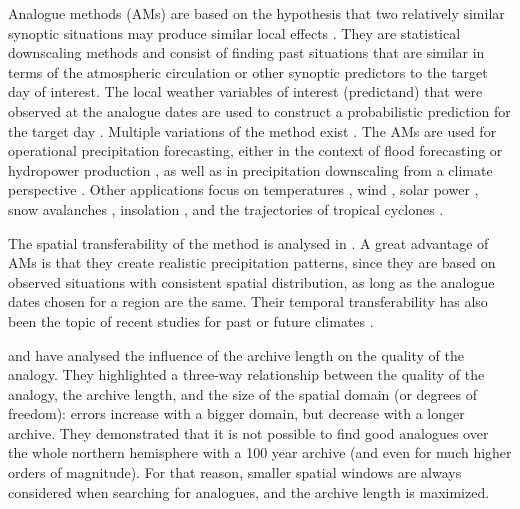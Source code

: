 \documentclass[hess, manuscript]{copernicus}
\begin{document}
	
	
	\introduction  %
	\label{sec:introduction}
	
	Analogue methods (AMs) are based on the hypothesis that two relatively similar synoptic situations may produce similar local effects \citep{Lorenz1956, Lorenz1969}. They are statistical downscaling methods \citep{Maraun2010} and consist of finding past situations that are similar in terms of the atmospheric circulation or other synoptic predictors to the target day of interest. The local weather variables of interest (predictand) that were observed at the analogue dates are used to construct a probabilistic prediction for the target day \citep{Duband1970, Zorita1999}. Multiple variations of the method exist \citep[a non-exhaustive listing can be found in][]{BenDaoud2016}. The AMs are used for operational precipitation forecasting, either in the context of flood forecasting or hydropower production \citep[e.g.,][]{Guilbaud1997, Bontron2005, Hamill2006, Desaint2008a, GarciaHernandez2009b, Bliefernicht2010, Marty2010, Marty2012, Horton2012, Obled2014, Hamill2015, BenDaoud2016}, as well as in precipitation downscaling from a climate perspective \citep[e.g.][]{Radanovics2013, Chardon2014, Dayon2015}. Other applications focus on temperatures \citep{Radinovic1975, Woodcock1980, Kruizinga1983, DelleMonache2013, Caillouet2016}, wind \citep{Gordon1987, DelleMonache2013, DelleMonache2011, Vanvyve2015, Alessandrini2015, Junk2015, Junk2015c}, solar power \citep{Alessandrini2015a, Bessa2015}, snow avalanches \citep{Obled1980, Bolognesi1993}, insolation \citep{Bois1981}, and the trajectories of tropical cyclones \citep{Keenan1981, Sievers2000, Fraedrich2003}.
	
	The spatial transferability of the method is analysed in \citet{Chardon2014}. A great advantage of AMs is that they create realistic precipitation patterns, since they are based on observed situations with consistent spatial distribution, as long as the analogue dates chosen for a region are the same. Their temporal transferability has also been the topic of recent studies for past or future climates \citep{Dayon2015, Caillouet2016}.
	
	\citet{Ruosteenoja1988} and \citet{Vandendool1994} have analysed the influence of the archive length on the quality of the analogy. They highlighted a three-way relationship between the quality of the analogy, the archive length, and the size of the spatial domain (or degrees of freedom): errors increase with a bigger domain, but decrease with a longer archive. They demonstrated that it is not possible to find good analogues over the whole northern hemisphere with a 100 year archive (and even for much higher orders of magnitude). For that reason, smaller spatial windows are always considered when searching for analogues, and the archive length is maximized. 
	
\end{document}
